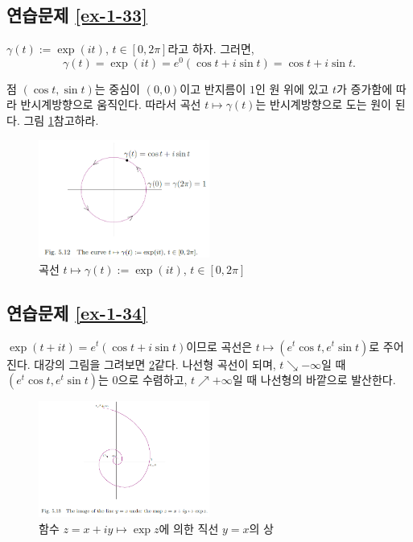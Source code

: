 \subsection*{연습문제 \ref{ex-1-33}}

$\gamma(t):= \exp(it)$, $t\in[0,2\pi]$라고 하자. 그러면,
\[
\gamma(t) = \exp(it) = e^0\left(\cos t + i\sin t\right) 
= \cos t + i\sin t.
\]

점 $(\cos t, \sin t)$는 중심이 $(0,0)$이고 반지름이 $1$인 원 위에 있고
$t$가 증가함에 따라 반시계방향으로 움직인다.
따라서 곡선 $t\mapsto \gamma(t)$는 반시계방향으로 도는 원이 된다.
그림 \ref{fig-5-12}\를 참고하라.

\begin{figure}[h!]
\begin{center}
\includegraphics[width=0.5\textwidth]{./Solution/figs/fig-5-12}
\end{center}
\caption{곡선 $t\mapsto \gamma(t):=\exp(it)$, $t\in[0,2\pi]$
}
\label{fig-5-12}
\end{figure}

\subsection*{연습문제 \ref{ex-1-34}}

$\exp(t+it) = e^t(\cos t + i\sin t)$이므로
곡선은 $t\mapsto (e^t\cos t, e^t\sin t)$로 주어진다.
대강의 그림을 그려보면 \ref{fig-5-13}\와 같다.
나선형 곡선이 되며, $t\searrow -\infty$일 때
$(e^t\cos t, e^t\sin t)$는 $0$으로 수렴하고,
$t\nearrow +\infty$일 때 나선형의 바깥으로 발산한다.

\begin{figure}[h!]
\begin{center}
\includegraphics[width=0.5\textwidth]{./Solution/figs/fig-5-13}
\end{center}
\caption{함수 $z=x+iy \mapsto \exp z$에 의한 직선 $y=x$의 상
}
\label{fig-5-13}
\end{figure}


